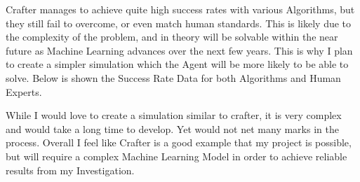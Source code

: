 \begin{flushleft}
                            Crafter manages to achieve quite high success rates with various Algorithms, but they still fail to overcome, or even match
                            human standards. This is likely due to the complexity of the problem, and in theory will be solvable within the near future
                            as Machine Learning advances over the next few years. This is why I plan to create a simpler simulation which the Agent will
                            be more likely to be able to solve. Below is shown the Success Rate Data for both Algorithms and Human Experts. \\

                            \vspace{0.4cm}
                            \begin{figure}
                                \centering
                                \qquad
                            \end{figure}
                            \vspace{0.2cm}

                            While I would love to create a simulation similar to crafter, it is very complex and would take a long time to develop. Yet
                            would not net many marks in the process. Overall I feel like Crafter is a good example that my project is possible, but will
                            require a complex Machine Learning Model in order to achieve reliable results from my Investigation.


\end{flushleft}
